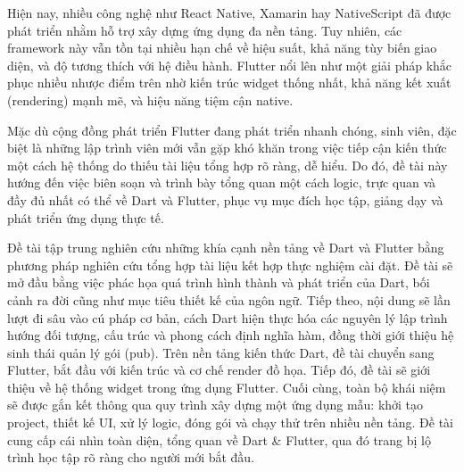 Hiện nay, nhiều công nghệ như React Native, Xamarin hay NativeScript đã được phát triển nhằm hỗ trợ xây dựng ứng dụng đa nền tảng. Tuy nhiên, các framework này vẫn tồn tại nhiều hạn chế về hiệu suất, khả năng tùy biến giao diện, và độ tương thích với hệ điều hành. Flutter nổi lên như một giải pháp khắc phục nhiều nhược điểm trên nhờ kiến trúc widget thống nhất, khả năng kết xuất (rendering) mạnh mẽ, và hiệu năng tiệm cận native.

Mặc dù cộng đồng phát triển Flutter đang phát triển nhanh chóng, sinh viên, đặc biệt là những lập trình viên mới vẫn gặp khó khăn trong việc tiếp cận kiến thức một cách hệ thống do thiếu tài liệu tổng hợp rõ ràng, dễ hiểu. Do đó, đề tài này hướng đến việc biên soạn và trình bày tổng quan một cách logic, trực quan và đầy đủ nhất có thể về Dart và Flutter, phục vụ mục đích học tập, giảng dạy và phát triển ứng dụng thực tế.

Đề tài tập trung nghiên cứu những khía cạnh nền tảng về Dart và Flutter bằng phương pháp nghiên cứu tổng hợp tài liệu kết hợp thực nghiệm cài đặt. Đề tài sẽ mở đầu bằng việc phác họa quá trình hình thành và phát triển của Dart, bối cảnh ra đời cũng như mục tiêu thiết kế của ngôn ngữ. Tiếp theo, nội dung sẽ lần lượt đi sâu vào cú pháp cơ bản, cách Dart hiện thực hóa các nguyên lý lập trình hướng đối tượng, cấu trúc và phong cách định nghĩa hàm, đồng thời giới thiệu hệ sinh thái quản lý gói (pub). Trên nền tảng kiến thức Dart, đề tài chuyển sang Flutter, bắt đầu với kiến trúc và cơ chế render đồ họa. Tiếp đó, đề tài sẽ giới thiệu về hệ thống widget trong ứng dụng Flutter. Cuối cùng, toàn bộ khái niệm sẽ được gắn kết thông qua quy trình xây dựng một ứng dụng mẫu: khởi tạo project, thiết kế UI, xử lý logic, đóng gói và chạy thử trên nhiều nền tảng. Đề tài cung cấp cái nhìn toàn diện, tổng quan về Dart \& Flutter, qua đó trang bị lộ trình học tập rõ ràng cho người mới bắt đầu.

